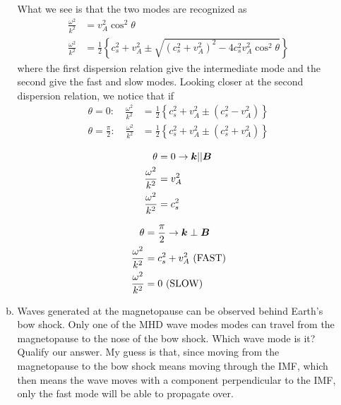 \begin{enumerate}
\begin{enumerate}[(a)]
        \mylinbrk{}
        What we see is that the two modes are recognized as
        \begin{align*}
            \frac{\omega^2}{k^2}&=v_A^2\cos^2\theta \\
            \frac{\omega^2}{k^2}&=\frac{1}{2}\left \{c_s^2+v_A^2\pm \sqrt{{\left(c_s^2+v_A^2\right)}^2-4c_s^2v_A^2\cos^2\theta}\right \}
        \end{align*}
        where the first dispersion relation give the intermediate mode and the second give the fast and slow modes. Looking closer at the second dispersion relation, we notice that if
        \begin{align*}
            \theta=0:\quad\frac{\omega^2}{k^2}&=\frac{1}{2}\left \{c_s^2+v_A^2\pm\left(c_s^2-v_A^2\right)\right \} \\
            \theta=\frac{\pi}{2}:\quad\frac{\omega^2}{k^2}&=\frac{1}{2}\left \{c_s^2+v_A^2\pm\left(c_s^2+v_A^2\right)\right \}
        \end{align*}
        \begin{minipage}{.4\linewidth}
            \begin{align*}
                \theta&=0 \rightarrow \boldsymbol{k}||\boldsymbol{B}\\
                \frac{\omega^2}{k^2}&=v_A^2\\
                \frac{\omega^2}{k^2}&=c_s^2
            \end{align*}
        \end{minipage}
        \begin{minipage}{.4\linewidth}
            \begin{align*}
                \theta&=\frac{\pi}{2} \rightarrow \boldsymbol{k}\perp\boldsymbol{B}\\
                \frac{\omega^2}{k^2}&=c_s^2+v_A^2~\textnormal{(FAST)}\\
                \frac{\omega^2}{k^2}&=0~\textnormal{(SLOW)}
            \end{align*}
        \end{minipage}
        \item Waves generated at the magnetopause can be observed behind Earth's bow shock. Only one of the MHD wave modes modes can travel from the magnetopause to the nose of the bow shock. Which wave mode is it? Qualify our answer.
        \mylinbrk{}
        My guess is that, since moving from the magnetopause to the bow shock means moving through the IMF, which then means the wave moves with a component perpendicular to the IMF, only the fast mode will be able to propagate over.
    \end{enumerate}
\end{enumerate}
